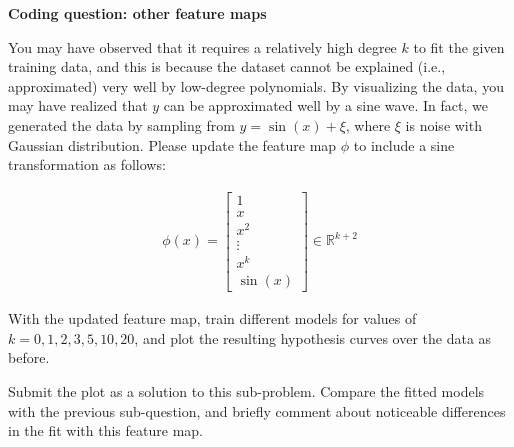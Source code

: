\item {} {\bf Coding question: other feature maps}

You may have observed that it requires a relatively high degree $k$ to fit the given training data, and this is because the dataset cannot be explained (i.e., approximated) very well by low-degree polynomials. By visualizing the data, you may have realized that $y$ can be approximated well by a sine wave. In fact, we generated the data by sampling from $y = \sin(x) + \xi$, where $\xi$ is noise with Gaussian distribution. Please update the feature map $\phi$ to include a sine transformation as follows:

\begin{align}
  \phi(x) = \left[\begin{array}{c} 1\\ x \\ x^2\\ \vdots \\x^k \\ \sin(x) \end{array}\right]\in \mathbb{R}^{k+2} \label{eqn:feature-sine}
\end{align}

With the updated feature map, train different models for values of $k=0,1,2,3,5,10,20$, and plot the resulting hypothesis curves over the data as before.

Submit the plot as a solution to this sub-problem. Compare the fitted models with the previous sub-question, and briefly comment about noticeable differences in the fit with this feature map.

